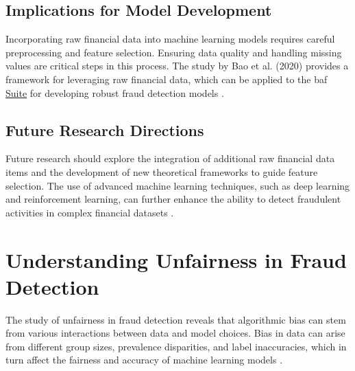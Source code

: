 \documentclass[12pt,a4paper]{report}
\begin{document}
\subsection{Implications for Model Development}
Incorporating raw financial data into machine learning models requires careful preprocessing and feature selection. Ensuring data quality and handling missing values are critical steps in this process. The study by Bao et al. (2020) provides a framework for leveraging raw financial data, which can be applied to the \acrshort{baf} \href{https://www.kaggle.com/datasets/sgpjesus/bank-account-fraud-dataset-neurips-2022/code}{Suite} for developing robust fraud detection models \citep{bao2020detecting}.\\

\subsection{Future Research Directions}
Future research should explore the integration of additional raw financial data items and the development of new theoretical frameworks to guide feature selection. The use of advanced machine learning techniques, such as deep learning and reinforcement learning, can further enhance the ability to detect fraudulent activities in complex financial datasets \citep{bao2020detecting}.\\



\section{Understanding Unfairness in Fraud Detection}
The study of unfairness in fraud detection reveals that algorithmic bias can stem from various interactions between data and model choices. Bias in data can arise from different group sizes, prevalence disparities, and label inaccuracies, which in turn affect the fairness and accuracy of machine learning models \citep{barocas2023fairness}.\\
\end{document}
